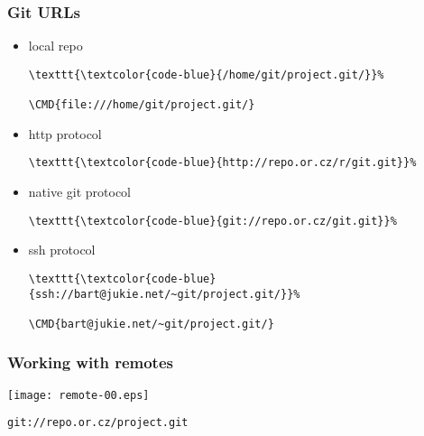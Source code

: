 \documentclass[english]{beamer}
\newcommand{\CMD}[1]{%
\texttt{\textcolor{code-blue}{#1}}%
}
\begin{document}
\begin{frame}[fragile]
\frametitle{Git URLs}

\begin{itemize}
        \item local repo \\
                \begin{Verbatim}[commandchars=\\\{\}]
\CMD{/home/git/project.git/}
\CMD{file:///home/git/project.git/}
                \end{Verbatim}
                \vspace{\baselineskip}
                \pause{}

        \item http protocol \\
                \begin{Verbatim}[commandchars=\\\{\}]
\CMD{http://repo.or.cz/r/git.git}
                \end{Verbatim}
                \vspace{\baselineskip}
                \pause{}

        \item native git protocol
                \begin{Verbatim}[commandchars=\\\{\}]
\CMD{git://repo.or.cz/git.git}
                \end{Verbatim}
                \vspace{\baselineskip}
                \pause{}

        \item ssh protocol
                \begin{Verbatim}[commandchars=\\\{\}]
\CMD{ssh://bart@jukie.net/~git/project.git/}
\CMD{bart@jukie.net/~git/project.git/}
                \end{Verbatim}
\end{itemize}
\end{frame}

\begin{frame}
\frametitle{Working with remotes}

\texttt{[image: remote-00.eps]}

\begin{center}
\CMD{git://repo.or.cz/project.git}
\end{center}
\vspace{\textheight}
\end{frame}
\end{document}
